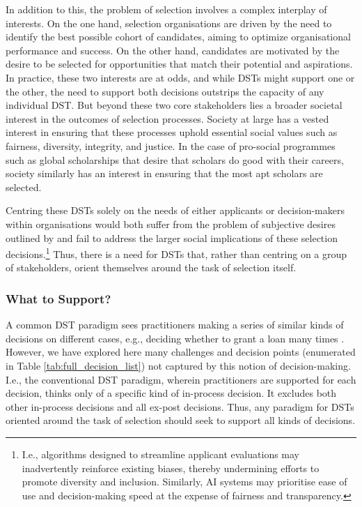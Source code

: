 In addition to this, the problem of selection involves a complex interplay of interests. On the one hand, selection organisations are driven by the need to identify the best possible cohort of candidates, aiming to optimize organisational performance and success. On the other hand, candidates are motivated by the desire to be selected for opportunities that match their potential and aspirations. In practice, these two interests are at odds, and while DSTs might support one or the other, the need to support both decisions outstrips the capacity of any individual DST. But beyond these two core stakeholders lies a broader societal interest in the outcomes of selection processes. Society at large has a vested interest in ensuring that these processes uphold essential social values such as fairness, diversity, integrity, and justice. In the case of pro-social programmes such as global scholarships that desire that scholars do good with their careers, society similarly has an interest in ensuring that the most apt scholars are selected.

Centring these DSTs solely on the needs of either applicants or decision-makers within organisations would both suffer from the problem of subjective desires outlined by \textcite{Lipton} and fail to address the larger social implications of these selection decisions.\footnote{I.e., algorithms designed to streamline applicant evaluations may inadvertently reinforce existing biases, thereby undermining efforts to promote diversity and inclusion. Similarly, AI systems may prioritise ease of use and decision-making speed at the expense of fairness and transparency.} Thus, there is a need for DSTs that, rather than centring on a group of stakeholders, orient themselves around the task of selection itself.

\subsubsection{What to Support?}
A common DST paradigm sees practitioners making a series of similar kinds of decisions on different cases, e.g., deciding whether to grant a loan many times \cite{GiveMeSomeCredit,barocas_hidden_2020,ustun_actionable_2019,Rebitschek_Gigerenzer_Wagner_2021,10.1111/j.1467-954X.2007.00740.x}. However, we have explored here many challenges and decision points (enumerated in Table \ref{tab:full_decision_list}) not captured by this notion of decision-making. I.e., the conventional DST paradigm, wherein practitioners are supported for each decision, thinks only of a specific kind of in-process decision. It excludes both other in-process decisions and all ex-post decisions. Thus, any paradigm for DSTs oriented around the task of selection should seek to support all kinds of decisions.

